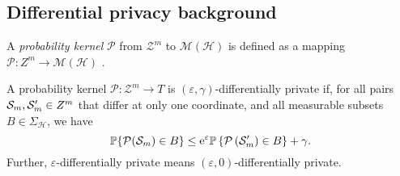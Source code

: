 \begin{noaddcontents}
\subsection{Differential privacy background}
\label{sec: back_dp}
\begin{definition}
A \emph{probability kernel} $\mathcal{P}$ from $\mathcal{Z}^m$ to $\mathcal{M}(\mathcal{H})$ is defined as a mapping $\mathcal{P}: {Z}^m \rightarrow \mathcal{M}(\mathcal{H})$ .
\end{definition}

\begin{definition}
A probability kernel $\mathcal{P}: \mathcal{Z}^m \rightarrow T$ is $(\varepsilon, \gamma)$-differentially private if, for all pairs $\mathcal{S}_m, \mathcal{S}_m^{\prime} \in Z^m$ that differ at only one coordinate, and all measurable subsets $B \in \Sigma_{\mathcal{H}}$, we have $$\mathbb{P}\{\mathcal{P}(\mathcal{S}_m) \in B\} \leq \mathrm{e}^{\varepsilon} \mathbb{P}\left\{\mathcal{P}\left(\mathcal{S}_m^{\prime}\right) \in B\right\}+\gamma.$$
Further, $\varepsilon$-differentially private means $(\varepsilon, 0)$-differentially private.
\end{definition}


\end{noaddcontents}
